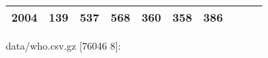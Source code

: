 \documentclass[]{article}
\newenvironment{Shaded}{\begin{snugshade}}{\end{snugshade}}
\newcommand{\AttributeTok}[1]{\textcolor[rgb]{0.77,0.63,0.00}{#1}}
\newcommand{\NormalTok}[1]{#1}
\newcommand{\SpecialStringTok}[1]{\textcolor[rgb]{0.31,0.60,0.02}{#1}}
\newcommand{\StringTok}[1]{\textcolor[rgb]{0.31,0.60,0.02}{#1}}
\newcommand{\VariableTok}[1]{\textcolor[rgb]{0.00,0.00,0.00}{#1}}
\begin{document}
\begin{longtable}[]{@{}llllllllll@{}}
\begin{minipage}[t]{0.04\columnwidth}
2004\strut
\end{minipage} & \begin{minipage}[t]{0.08\columnwidth}\raggedright
139\strut
\end{minipage} & \begin{minipage}[t]{0.09\columnwidth}\raggedright
537\strut
\end{minipage} & \begin{minipage}[t]{0.09\columnwidth}\raggedright
568\strut
\end{minipage} & \begin{minipage}[t]{0.09\columnwidth}\raggedright
360\strut
\end{minipage} & \begin{minipage}[t]{0.09\columnwidth}\raggedright
358\strut
\end{minipage} & \begin{minipage}[t]{0.09\columnwidth}\raggedright
386\strut
\end{minipage}\tabularnewline
\bottomrule
\end{longtable}

\begin{Shaded}
\end{Shaded}

data/who.csv.gz {[}76046 8{]}:
\end{document}
